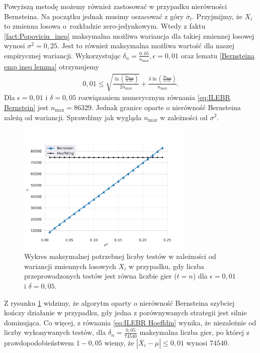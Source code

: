 \documentclass[inzynierska]{pwr_wmat_praca_dyplomowa}
\theoremstyle{plain}
\numberwithin{theorem}{chapter}
\theoremstyle{definition}
\numberwithin{theorem}{chapter}
\newcommand{\nmax}{n_{\text{max}}}
\begin{document}
	Powyższą metodę możemy również zastosować w przypadku nierówności Bernsteina.
	Na początku jednak musimy oszacować z góry $\overline{\sigma}_t$.
	Przyjmijmy, że $X_i$ to zmienna losowa o~rozkładzie zero-jedynkowym.
	Wtedy z faktu \ref{fact:Popoviciu_ineq} maksymalna możliwa wariancja dla takiej zmiennej losowej wynosi $\sigma^2 = 0,25$. Jest to również maksymalna możliwa wartość dla naszej empirycznej wariancji. Wykorzystując $\delta_{n} = \frac{0,05}{\nmax}, \epsilon = 0,01$ oraz lematu \ref{Bernsteina emp ineq lemma} otrzymujemy
	\begin{gather}
		\label{eq:ILEBR Bernstein}
		0,01 \le \sqrt{\frac{\ln(\frac{3\nmax}{0,05})}{2\nmax}} + \frac{3  \ln(\frac{3\nmax}{0,05})}{\nmax}.
	\end{gather}
	Dla $\epsilon=0,01$ i $\delta=0,05$ rozwiązaniem numerycznym równania \eqref{eq:ILEBR Bernstein} jest $\nmax=86329$. Jednak granice oparte o nierówność Bernsteina zależą od wariancji. Sprawdźmy jak wygląda $\nmax$ w zależności od $\sigma^2$.
	\begin{figure}
		\centering
		\includegraphics[width=0.75\textwidth]{imagens/t_eq_n.pdf}
		\caption{Wykres maksymalnej potrzebnej liczby testów w zależności od wariancji zmiennych losowych  $X_i$ w przypadku, gdy liczba przeprowadzonych testów jest równa liczbie gier ($t = n$) dla $\epsilon=0,01$ i $\delta = 0,05$.}
		\label{fig:t_eq_n}
	\end{figure}
	Z rysunku \ref{fig:t_eq_n} widzimy, że algorytm oparty o nierówność Bernsteina szybciej kończy działanie w przypadku, gdy jedna z porównywanych strategii jest silnie dominująca. Co więcej, z równania \eqref{eq:ILEBR Hoeffdin} wynika, że niezależnie od liczby wykonywanych testów, dla $\delta_n = \frac{0,05}{74540}$ maksymalna liczba gier, po której z prawdopodobieństwem $1-0,05$ wiemy, że $|\overline{X_i} - \mu| \le 0,01$ wynosi $74540$. 
	
\end{document}
